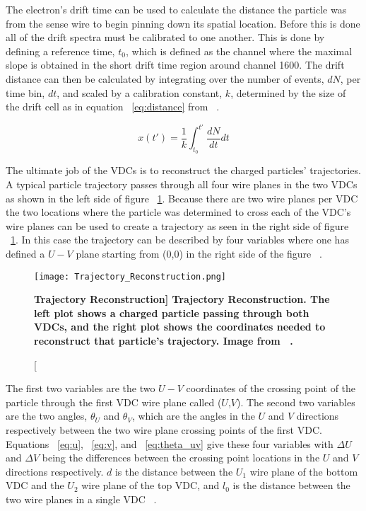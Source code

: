 The electron's drift time can be used to calculate the distance the particle was from the sense wire to begin pinning down its spatial location. Before this is done all of the drift spectra must be calibrated to one another. This is done by defining a reference time, $t_0$, which is defined as the channel where the maximal slope is obtained in the short drift time region around channel 1600. The drift distance can then be calculated by integrating over the number of events, $dN$, per time bin, $dt$, and scaled by a calibration constant, $k$, determined by the size of the drift cell as in equation ~\ref{eq:distance} from ~\cite{Article:VDCs}.

\begin{equation} \label{eq:distance}
	x(t') = \frac{1}{k} \int_{t_0}^{t'} \frac{dN}{dt} dt
\end{equation}

The ultimate job of the VDCs is to reconstruct the charged particles' trajectories. A typical particle trajectory passes through all four wire planes in the two VDCs as shown in the left side of figure ~\ref{fig:trajectory}. Because there are two wire planes per VDC the two locations where the particle was determined to cross each of the VDC's wire planes can be used to create a trajectory as seen in the right side of figure ~\ref{fig:trajectory}. In this case the trajectory can be described by four variables where one has defined a $U-V$ plane starting from (0,0) in the right side of the figure ~\cite{Article:VDCs}. 

\begin{figure}[!ht]
\begin{center}
\texttt{[image: Trajectory\_Reconstruction.png]}
\end{center}
\caption[\bf{Trajectory Reconstruction}]{
{\bf{Trajectory Reconstruction.}} The left plot shows a charged particle passing through both VDCs, and the right plot shows the coordinates needed to reconstruct that particle's trajectory. Image from ~\cite{Article:VDCs}.}
\label{fig:trajectory}
\end{figure}

The first two variables are the two $U-V$ coordinates of the crossing point of the particle through the first VDC wire plane called ($U$,$V$). The second two variables are the two angles, $\theta_U$ and $\theta_V$, which are the angles in the $U$ and $V$ directions respectively between the two wire plane crossing points of the first VDC. Equations ~\ref{eq:u}, ~\ref{eq:v}, and ~\ref{eq:theta_uv} give these four variables with $\Delta U$ and $\Delta V$ being the differences between the crossing point locations in the $U$ and $V$ directions respectively. $d$ is the distance between the $U_1$ wire plane of the bottom VDC and the $U_2$ wire plane of the top VDC, and $l_0$ is the distance between the two wire planes in a single VDC~\cite{Article:VDCs} .

